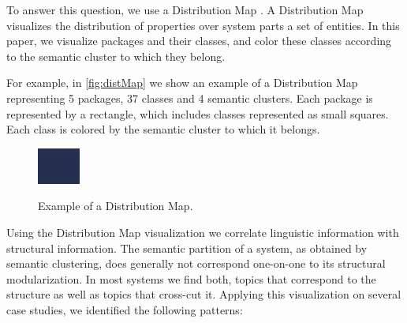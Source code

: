 To answer this question, we use a Distribution Map \cite{Tuft01a,Duca06c}. A Distribution Map visualizes the distribution of properties over system parts \ie a set of entities. In this paper, we visualize packages and their classes, and color these classes according to the semantic cluster to which they belong.

For example, in \autoref{fig:distMap} we show an example of a Distribution Map representing 5 packages, 37 classes and 4 semantic clusters. Each package is represented by a rectangle, which includes classes represented as small squares. Each class is colored by the semantic cluster to which it belongs.

\begin{figure}[h]
    \centering
  \includegraphics{MetricExamples}\\
  \caption{Example of a Distribution Map.}\label{fig:distMap}
\end{figure}

Using the Distribution Map visualization we correlate linguistic information with structural information. The semantic partition of a system, as obtained by semantic clustering, does generally not correspond one-on-one to its structural modularization. In most systems we find both, topics that correspond to the structure as well as topics that cross-cut it. Applying this visualization on several case studies, we identified the following patterns:

